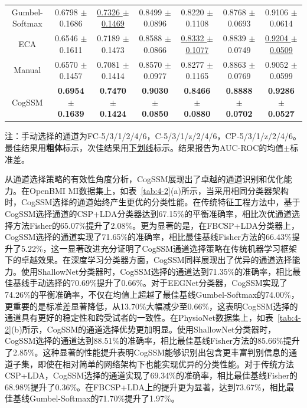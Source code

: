 \begin{table}[htbp]
{\begin{tabular}{ccccccc}
Gumbel-Softmax & 0.6798 $\pm$ 0.1686 & \uline{0.7326 $\pm$ 0.1469} & 0.8499 $\pm$ 0.0896 & 0.8220 $\pm$ 0.1108 & 0.8768 $\pm$ 0.0693 & 0.9106 $\pm$ 0.0614 \\
ECA & 0.6546 $\pm$ 0.1611 & 0.7189 $\pm$ 0.1473 & 0.8588 $\pm$ 0.0866 & \uline{0.8332 $\pm$ 0.1077} & 0.8839 $\pm$ 0.0749 & \uline{0.9204 $\pm$ 0.0509} \\
Manual & 0.6570 $\pm$ 0.1457 & 0.7081 $\pm$ 0.1414 & 0.8570 $\pm$ 0.0977 & 0.8277 $\pm$ 0.1165 & 0.8863 $\pm$ 0.0769 & 0.9052 $\pm$ 0.0599 \\
CogSSM & \textbf{0.6954 $\pm$ 0.1639} & \textbf{0.7470 $\pm$ 0.1424} & \textbf{0.9030 $\pm$ 0.0850} & \textbf{0.8466 $\pm$ 0.0880} & \textbf{0.8888 $\pm$ 0.0702} & \textbf{0.9286 $\pm$ 0.0527} \\ 
\bottomrule
\end{tabular}%
}
\begin{tablenotes}
\footnotesize
\item[]\centering 注：手动选择的通道为FC-5/3/1/2/4/6，C-5/3/1/z/2/4/6，CP-5/3/1/z/2/4/6。最佳结果用\textbf{粗体}标示，次佳结果用\underline{下划线}标示。结果报告为AUC-ROC的均值$\pm$标准差。
\end{tablenotes}
\label{tab:4-3}
\end{table}


从通道选择策略的有效性角度分析，CogSSM展现出了卓越的通道识别和优化能力。在OpenBMI MI数据集上，如表~\ref{tab:4-2}(a)所示，当采用相同分类器架构时，CogSSM选择的通道始终产生更优的分类性能。在传统特征工程方法中，基于CogSSM选择通道的CSP+LDA分类器达到67.15\%的平衡准确率，相比次优通道选择方法Fisher的65.07\%提升了2.08\%。更为显著的是，在FBCSP+LDA分类器上，CogSSM选择的通道实现了71.65\%的准确率，相比最佳基线Fisher方法的66.43\%提升了5.22\%，这一显著改进充分证明了CogSSM通道选择策略在传统机器学习框架下的卓越效果。在深度学习分类器方面，CogSSM同样展现出了优异的通道选择能力。使用ShallowNet分类器时，CogSSM选择的通道达到71.35\%的准确率，相比最佳基线手动选择的70.69\%提升了0.66\%。对于EEGNet分类器，CogSSM实现了74.26\%的平衡准确率，不仅在均值上超越了最佳基线Gumbel-Softmax的74.00\%，更重要的是标准差显著降低，从13.70\%大幅减少至0.66\%，这表明CogSSM选择的通道具有更好的稳定性和跨受试者的一致性。在PhysioNet数据集上，如表~\ref{tab:4-2}(b)所示，CogSSM的通道选择优势更加明显。使用ShallowNet分类器时，CogSSM选择的通道达到88.51\%的准确率，相比最佳基线Fisher方法的85.66\%提升了2.85\%。这种显著的性能提升表明CogSSM能够识别出包含更丰富判别信息的通道子集，即使在相对简单的网络架构下也能实现优异的分类性能。对于传统方法CSP+LDA，CogSSM选择的通道实现了69.34\%的准确率，相比最佳基线Fisher的68.98\%提升了0.36\%。在FBCSP+LDA上的提升更为显著，达到73.67\%，相比最佳基线Gumbel-Softmax的71.70\%提升了1.97\%。

